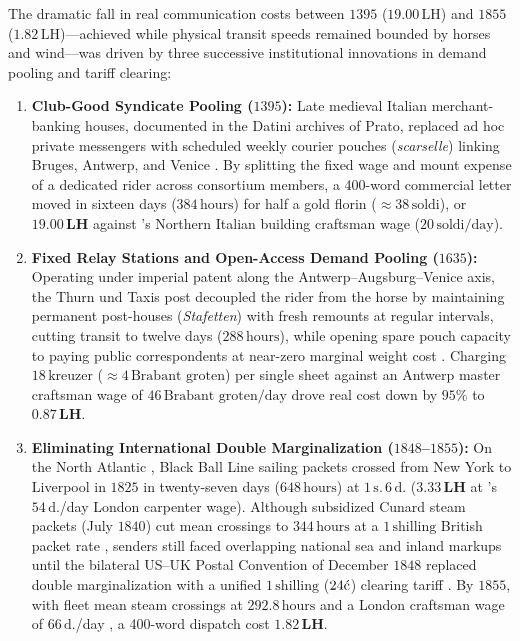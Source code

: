 \documentclass[11pt,a4paper]{article}
\newcommand{\ct}{\symbol{"00A2}}
\begin{document}
The dramatic fall in real communication costs between $1395$ ($19.00\,\text{LH}$) and $1855$ ($1.82\,\text{LH}$)---achieved while physical transit speeds remained bounded by horses and wind---was driven by three successive institutional innovations in demand pooling and tariff clearing:
\begin{enumerate}
    \item \textbf{Club-Good Syndicate Pooling ($1395$):} Late medieval Italian merchant-banking houses, documented in the Datini archives of Prato, replaced ad hoc private messengers with scheduled weekly courier pouches (\textit{scarselle}) linking Bruges, Antwerp, and Venice \citep{Melis1962,Frangioni1994}. By splitting the fixed wage and mount expense of a dedicated rider across consortium members, a 400-word commercial letter moved in sixteen days ($384\,\text{hours}$) for half a gold florin ($\approx 38\,\text{soldi}$), or $\mathbf{19.00\,\text{LH}}$ against \citet{Malanima2007}'s Northern Italian building craftsman wage ($20\,\text{soldi/day}$).
    \item \textbf{Fixed Relay Stations and Open-Access Demand Pooling ($1635$):} Operating under imperial patent along the Antwerp--Augsburg--Venice axis, the Thurn und Taxis post decoupled the rider from the horse by maintaining permanent post-houses (\textit{Stafetten}) with fresh remounts at regular intervals, cutting transit to twelve days ($288\,\text{hours}$), while opening spare pouch capacity to paying public correspondents at near-zero marginal weight cost \citep{Rubsam1889,Dallmeier1977,Behringer1990}. Charging $18\,\text{kreuzer}$ ($\approx 4\,\text{Brabant groten}$) per single sheet against an Antwerp master craftsman wage of $46\,\text{Brabant groten/day}$ \citep{VanderWee1963} drove real cost down by $95\%$ to $\mathbf{0.87\,\text{LH}}$.
    \item \textbf{Eliminating International Double Marginalization ($1848$--$1855$):} On the North Atlantic \citep{North1958,Harley1988,Bogart2005}, Black Ball Line sailing packets crossed from New York to Liverpool in $1825$ in twenty-seven days ($648\,\text{hours}$) at $1\,\text{s.}\,6\,\text{d.}$ ($\mathbf{3.33\,\text{LH}}$ at \citealt{Bowley1900}'s $54\,\text{d.}$/day London carpenter wage). Although subsidized Cunard steam packets (July $1840$) cut mean crossings to $344\,\text{hours}$ at a $1\,\text{shilling}$ British packet rate \citep{Arnell1980}, senders still faced overlapping national sea and inland markups until the bilateral US--UK Postal Convention of December $1848$ replaced double marginalization with a unified $1\,\text{shilling}$ ($24\ct$) clearing tariff \citep{BPP1849}. By $1855$, with fleet mean steam crossings at $292.8\,\text{hours}$ \citep{BPP1855} and a London craftsman wage of $66\,\text{d.}$/day \citep{Bowley1900}, a 400-word dispatch cost $\mathbf{1.82\,\text{LH}}$.
\end{enumerate}
\end{document}
